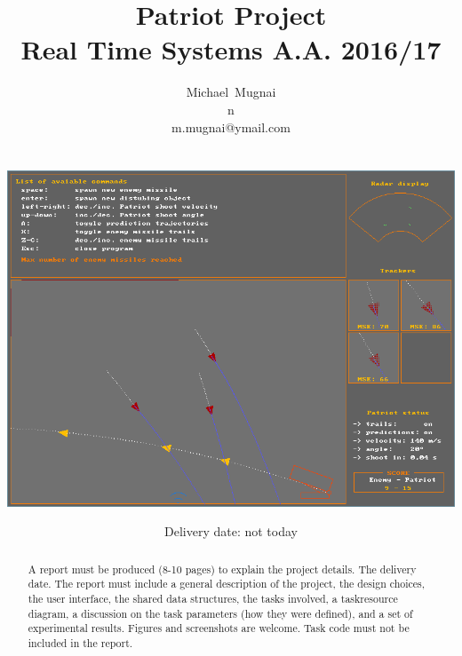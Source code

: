 \documentclass[notitlepage,a4paper,11pt]{article} %
\title{Patriot Project \\
	\large Real Time Systems A.A. 2016/17}
\author{Michael~Mugnai\\n\textdegree 556448\\m.mugnai@ymail.com \\ \\ \\
	\includegraphics[width=\textwidth]{cover.png}}
\date{Delivery date: not today}
\begin{document}
\maketitle

\begin{abstract} %
	A report must be produced (8-10 pages) to explain the project details. The delivery date.
	The report must include a general description of the project, the design choices, the user interface,
	the shared data structures, the tasks involved, a taskresource diagram, a discussion on the task
	parameters (how they were defined), and a set of experimental results. Figures and screenshots are welcome.
	Task code must not be included in the report.
\end{abstract}

\newpage
\hypersetup{linkcolor=black}
\tableofcontents
\hypersetup{linkcolor=blue}
\newpage
\end{document}
